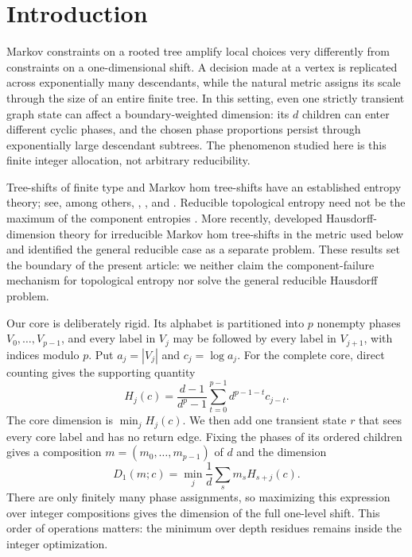 \section{Introduction}
\label{sec:introduction}

Markov constraints on a rooted tree amplify local choices very differently
from constraints on a one-dimensional shift.  A decision made at a vertex is
replicated across exponentially many descendants, while the natural metric
assigns its scale through the size of an entire finite tree.  In this setting,
even one strictly transient graph state can affect a boundary-weighted
dimension: its $d$ children can enter different cyclic phases, and the chosen
phase proportions persist through exponentially large descendant subtrees.
The phenomenon studied here is this finite integer allocation, not arbitrary
reducibility.

Tree-shifts of finite type and Markov hom tree-shifts have an established
entropy theory; see, among others, \citet{aubrunBeal2012},
\citet{petersenSalama2018}, and \citet{petersenSalama2020}.  Reducible
topological entropy need not be the maximum of the component entropies
\citep{banEtAl2021,banEtAl2022}.  More recently,
\citet{banLaiWu2025} developed Hausdorff-dimension theory for irreducible
Markov hom tree-shifts in the metric used below and identified the general
reducible case as a separate problem.  These results set the boundary of the
present article: we neither claim the component-failure mechanism for
topological entropy nor solve the general reducible Hausdorff problem.

Our core is deliberately rigid.  Its alphabet is partitioned into $p$
nonempty phases $V_0,\ldots,V_{p-1}$, and every label in $V_j$ may be followed
by every label in $V_{j+1}$, with indices modulo $p$.  Put
$a_j=|V_j|$ and $c_j=\log a_j$.  For the complete core, direct counting gives
the supporting quantity
\[
 H_j(c)=\frac{d-1}{d^p-1}
 \sum_{t=0}^{p-1}d^{p-1-t}c_{j-t}.
\]
The core dimension is $\min_j H_j(c)$.  We then add one transient state $r$
that sees every core label and has no return edge.  Fixing the phases of its
ordered children gives a composition $m=(m_0,\ldots,m_{p-1})$ of $d$ and the
dimension
\[
 D_1(m;c)=\min_j\frac1d\sum_s m_s H_{s+j}(c).
\]
There are only finitely many phase assignments, so maximizing this expression
over integer compositions gives the dimension of the full one-level shift.
This order of operations matters: the minimum over depth residues remains
inside the integer optimization.

